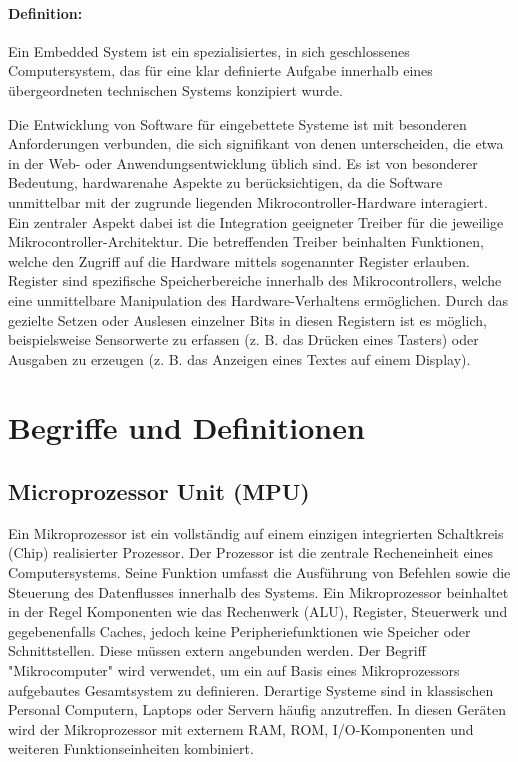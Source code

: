 \paragraph{Definition:}
Ein Embedded System ist ein spezialisiertes, in sich geschlossenes Computersystem, das für eine klar definierte Aufgabe innerhalb eines übergeordneten technischen Systems konzipiert wurde.

\vspace{6 mm}

Die Entwicklung von Software für eingebettete Systeme ist mit besonderen Anforderungen verbunden, die sich signifikant von denen unterscheiden, die etwa in der Web- oder Anwendungsentwicklung üblich sind.
Es ist von besonderer Bedeutung, hardwarenahe Aspekte zu berücksichtigen, da die Software unmittelbar mit der zugrunde liegenden Mikrocontroller-Hardware interagiert.
Ein zentraler Aspekt dabei ist die Integration geeigneter Treiber für die jeweilige Mikrocontroller-Architektur.
Die betreffenden Treiber beinhalten Funktionen, welche den Zugriff auf die Hardware mittels sogenannter Register erlauben.
Register sind spezifische Speicherbereiche innerhalb des Mikrocontrollers, welche eine unmittelbare Manipulation des Hardware-Verhaltens ermöglichen.
Durch das gezielte Setzen oder Auslesen einzelner Bits in diesen Registern ist es möglich, beispielsweise Sensorwerte zu erfassen (z. B. das Drücken eines Tasters) oder Ausgaben zu erzeugen (z. B. das Anzeigen eines Textes auf einem Display).



\section{Begriffe und Definitionen}

\subsection*{Microprozessor Unit (MPU)}
Ein Mikroprozessor ist ein vollständig auf einem einzigen integrierten Schaltkreis (Chip) realisierter Prozessor.
Der Prozessor ist die zentrale Recheneinheit eines Computersystems.
Seine Funktion umfasst die Ausführung von Befehlen sowie die Steuerung des Datenflusses innerhalb des Systems. 
Ein Mikroprozessor beinhaltet in der Regel Komponenten wie das Rechenwerk (ALU), Register, Steuerwerk und gegebenenfalls Caches, jedoch keine Peripheriefunktionen wie Speicher oder Schnittstellen. 
Diese müssen extern angebunden werden.
Der Begriff "Mikrocomputer" wird verwendet, um ein auf Basis eines Mikroprozessors aufgebautes Gesamtsystem zu definieren. 
Derartige Systeme sind in klassischen Personal Computern, Laptops oder Servern häufig anzutreffen.
In diesen Geräten wird der Mikroprozessor mit externem RAM, ROM, I/O-Komponenten und weiteren Funktionseinheiten kombiniert.

